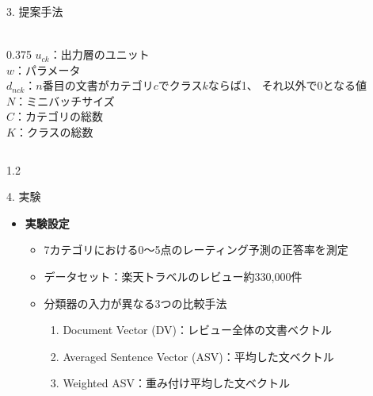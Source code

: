 \documentclass[unicode,10pt]{beamer}
\newlength{\mycolumnwidth}
\newcommand{\itemtitle}[1]{\textbf{#1}\\}
\begin{document}
\begin{frame}
\begin{block}{3. 提案手法}
\begin{columns}[onlytextwidth,t]
\begin{column}{\mycolumnwidth}
\begin{itemize}
{\begin{gather*}
              \nonumber
            \end{gather*}
          }{0.375\linewidth}{
            \small
            $u_{ck}$：出力層のユニット \\
            $w$：パラメータ \\
            $d_{nck}$：$n$番目の文書がカテゴリ$c$でクラス$k$ならば1、
            それ以外で0となる値 \\
            $N$：ミニバッチサイズ \\
            $C$：カテゴリの総数 \\
            $K$：クラスの総数 \\
          }
      \end{itemize}
    \end{column}
  \end{columns}
\end{block}

\begin{columns}[onlytextwidth,t]
  \begin{column}{1.2\mycolumnwidth}
    \begin{block}{4. 実験}
      \begin{itemize}
        \item \itemtitle{実験設定}
          \begin{itemize}
            \item 7カテゴリにおける0〜5点のレーティング予測の正答率を測定
            \item データセット：楽天トラベルのレビュー約330,000件
            \item 分類器の入力が異なる3つの比較手法
              \begin{enumerate}
                \item Document Vector (DV)：レビュー全体の文書ベクトル
                \item Averaged Sentence Vector (ASV)：平均した文ベクトル
                \item Weighted ASV：重み付け平均した文ベクトル
              \end{enumerate}
          \end{itemize}
      \end{itemize}


\end{block}
\end{column}
\end{columns}
\end{frame}
\end{document}
